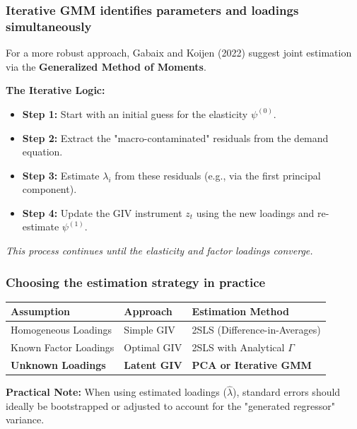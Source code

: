 \documentclass[aspectratio=169,11pt]{beamer}
\begin{document}
\begin{frame}
    \frametitle{Iterative GMM identifies parameters and loadings simultaneously}
    
    \vspace{0.3cm}
    {\Large
        For a more robust approach, Gabaix and Koijen (2022) suggest joint estimation via the \textbf{Generalized Method of Moments}.
    }
    
    \vspace{0.5cm}
    \textbf{The Iterative Logic:}
    \begin{itemize}
        \item \textbf{Step 1:} Start with an initial guess for the elasticity $\psi^{(0)}$.
        \item \textbf{Step 2:} Extract the "macro-contaminated" residuals from the demand equation.
        \item \textbf{Step 3:} Estimate $\lambda_i$ from these residuals (e.g., via the first principal component).
        \item \textbf{Step 4:} Update the GIV instrument $z_t$ using the new loadings and re-estimate $\psi^{(1)}$.
    \end{itemize}
    \vspace{0.3cm}
    \textit{This process continues until the elasticity and factor loadings converge.}
\end{frame}

\begin{frame}
    \frametitle{Choosing the estimation strategy in practice}
    
    \vspace{0.5cm}
    \begin{center}
    \renewcommand{\arraystretch}{1.5}
    \begin{tabular}{l l l}
        \toprule
        \textbf{Assumption} & \textbf{Approach} & \textbf{Estimation Method} \\
        \midrule
        \rowcolor{Teal!10} Homogeneous Loadings & Simple GIV & 2SLS (Difference-in-Averages) \\
        Known Factor Loadings & Optimal GIV & 2SLS with Analytical $\Gamma$ \\
        \rowcolor{WarmOrange!10} \textbf{Unknown Loadings} & \textbf{Latent GIV} & \textbf{PCA or Iterative GMM} \\
        \bottomrule
    \end{tabular}
    \end{center}
    
    \vspace{0.8cm}
    \textbf{Practical Note:} When using estimated loadings ($\hat{\lambda}$), standard errors should ideally be bootstrapped or adjusted to account for the "generated regressor" variance.
\end{frame}
\end{document}
